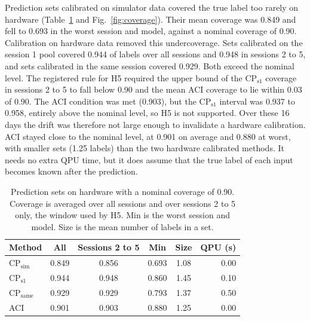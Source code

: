 \documentclass[10pt,conference]{IEEEtran}
\begin{document}
Prediction sets calibrated on simulator data
covered the true label too rarely on hardware (Table~\ref{tab:coverage} and
Fig.~\ref{fig:coverage}). Their mean coverage was 0.849 and fell to 0.693 in the worst session and
model, against a nominal coverage of 0.90. Calibration on hardware data removed this undercoverage. Sets calibrated on the session 1 pool covered 0.944 of labels over all sessions and 0.948 in
sessions 2 to 5, and sets calibrated in the same session covered 0.929. Both exceed the nominal
level. The registered rule for H5 required the upper bound of the CP$_\mathrm{s1}$ coverage in
sessions 2 to 5 to fall below 0.90 and the mean ACI coverage to lie within 0.03 of 0.90. The ACI
condition was met (0.903), but the CP$_\mathrm{s1}$ interval was 0.937 to 0.958, entirely above
the nominal level, so H5 is not supported. Over these 16 days the drift was therefore not large enough to invalidate a hardware
calibration. ACI stayed close to the nominal level, at 0.901 on average and 0.880 at worst, with smaller sets (1.25 labels)
than the two hardware calibrated methods. It needs no extra QPU time, but it does assume that the
true label of each input becomes known after the prediction.

\begin{table}[t]
\centering
\caption{Prediction sets on hardware with a nominal coverage of 0.90. Coverage is averaged over all
sessions and over sessions 2 to 5 only, the window used by H5. Min is the worst session and model.
Size is the mean number of labels in a set.}
\label{tab:coverage}
\footnotesize
\setlength{\tabcolsep}{4pt}
\begin{tabular}{lccccr}
\toprule
Method & All & Sessions 2 to 5 & Min & Size & QPU (s) \\
\midrule
CP$_{\mathrm{sim}}$ & 0.849 & 0.856 & 0.693 & 1.08 & 0.00 \\
CP$_{\mathrm{s1}}$ & 0.944 & 0.948 & 0.860 & 1.45 & 0.10 \\
CP$_{\mathrm{same}}$ & 0.929 & 0.929 & 0.793 & 1.37 & 0.50 \\
ACI & 0.901 & 0.903 & 0.880 & 1.25 & 0.00 \\
\bottomrule
\end{tabular}
\end{table}
\end{document}
